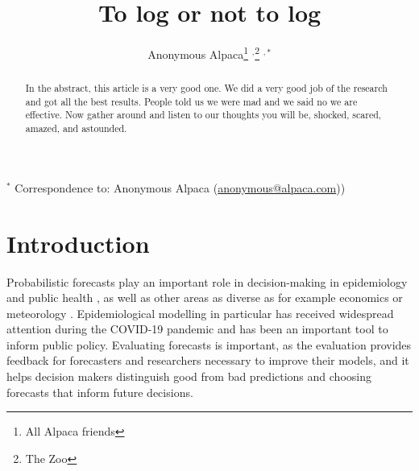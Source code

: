 \documentclass{article}
\begin{document}
\title{To log or not to log}
  \author{Anonymous Alpaca\thanks{All Alpaca friends} $^{,}$\thanks{The Zoo} $^{ , *}$}

\maketitle

\tableofcontents

\begin{abstract}
In the abstract, this article is a very good one. We did a very good job of the research and got all the best results. People told us we were mad and we said no we are effective. Now gather around and listen to our thoughts you will be, shocked, scared, amazed, and astounded.
\end{abstract}

\bigskip

{\footnotesize $^*$ Correspondence to: Anonymous Alpaca (\url{anonymous@alpaca.com}))}



\newpage


\section{Introduction}

Probabilistic forecasts play an important role in decision-making in epidemiology and public health \citep{reichCollaborativeMultiyearMultimodel2019, funkShorttermForecastsInform2020, cramerEvaluationIndividualEnsemble2021, bracherShorttermForecastingCOVID192021, europeancovid-19forecasthubEuropeanCovid19Forecast2021, sherrattPredictivePerformanceMultimodel2022}, as well as other areas as diverse as for example economics \citep{timmermannForecastingMethodsFinance2018, elliottForecastingEconomicsFinance2016} or meteorology \citep{gneitingWeatherForecastingEnsemble2005, kukkonenReviewOperationalRegionalscale2012}. Epidemiological modelling in particular has received widespread attention during the COVID-19 pandemic and has been an important tool to inform public policy. Evaluating forecasts is important, as the evaluation provides feedback for forecasters and researchers necessary to improve their models, and it helps decision makers distinguish good from bad predictions and choosing forecasts that inform future decisions.
\end{document}
